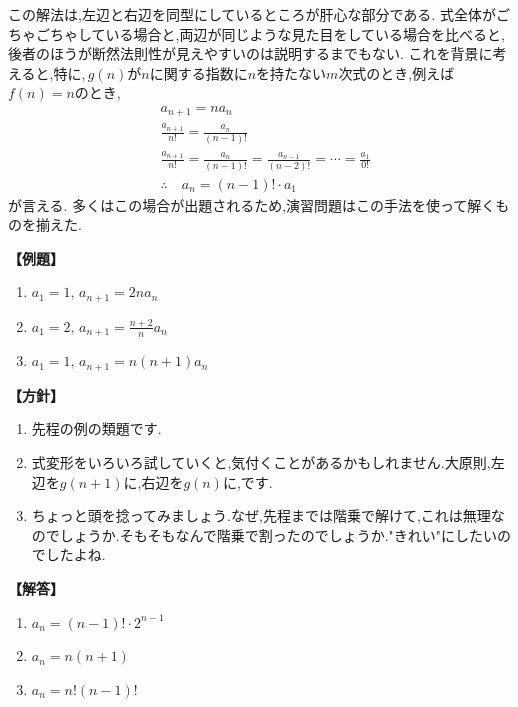     この解法は,左辺と右辺を同型にしているところが肝心な部分である.
    式全体がごちゃごちゃしている場合と,両辺が同じような見た目をしている場合を比べると,後者のほうが断然法則性が見えやすいのは説明するまでもない.
    これを背景に考えると,特に,\,$g(n)$が$n$に関する指数に$n$を持たない$m$次式のとき,例えば$f(n)=n$のとき,
    \begin{align*}
      &a_{n+1}=na_n\\
      &\frac{a_{n+1}}{n!}=\frac{a_n}{(n-1)!}\\
      &\frac{a_{n+1}}{n!}=\frac{a_n}{(n-1)!}=\frac{a_{n-1}}{(n-2)!}=\cdots=\frac{a_1}{0!}\\
      &\therefore \quad a_n=(n-1)!\cdot a_1
    \end{align*}
    が言える.
    多くはこの場合が出題されるため,演習問題はこの手法を使って解くものを揃えた.
    
    \noindent \textbf{【例題】}
    \begin{enumerate}[label=(\arabic*),parsep=3pt]
      \item $\displaystyle a_1=1,\, a_{n+1}=2na_n$
      \item $\displaystyle a_1=2,\, a_{n+1}=\frac{n+2}{n}a_n$
      \item $\displaystyle a_1=1,\, a_{n+1}=n(n+1)a_n$
    \end{enumerate}

    \noindent\textbf{【方針】}
    \begin{enumerate}[label=(\arabic*),parsep=3pt]
      \item 先程の例の類題です.
      \item 式変形をいろいろ試していくと,気付くことがあるかもしれません.大原則,左辺を$g(n+1)$に,右辺を$g(n)$に,です.
      \item ちょっと頭を捻ってみましょう.なぜ,先程までは階乗で解けて,これは無理なのでしょうか.そもそもなんで階乗で割ったのでしょうか."きれい"にしたいのでしたよね.
    \end{enumerate}

    \noindent\textbf{【解答】}
    \begin{enumerate}[label=(\arabic*),parsep=3pt]
      \item $\displaystyle a_n=(n-1)!\cdot 2^{n-1}$
      \item $\displaystyle a_n=n(n+1)$
      \item $\displaystyle a_n=n!(n-1)!$
    \end{enumerate}

